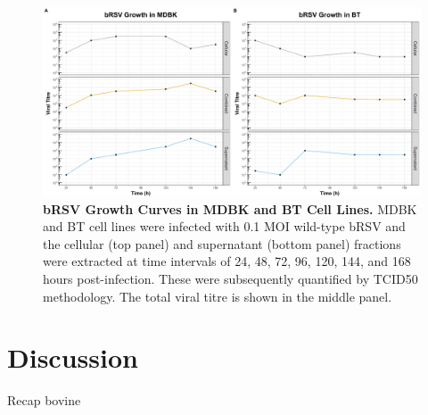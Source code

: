 \begin{figure}
    \centering
    \includegraphics[width=1\linewidth]{07. Chapter 2/Figs/01. Technologies/01. growth_curves.pdf}
    \caption[bRSV Growth Curves in MDBK and BT Cell Lines.]{\textbf{bRSV Growth Curves in MDBK and BT Cell Lines.} MDBK and BT cell lines were infected with 0.1 MOI wild-type bRSV and the cellular (top panel) and supernatant (bottom panel) fractions were extracted at time intervals of 24, 48, 72, 96, 120, 144, and 168 hours post-infection. These were subsequently quantified by TCID50 methodology. The total viral titre is shown in the middle panel.}
    \label{fig:bRSV growth curves in MDBK and BT cell lines}
\end{figure}



\section{Discussion} \label{sec:Discussion Chapter2}
Recap bovine

\lipsum[1-6]


